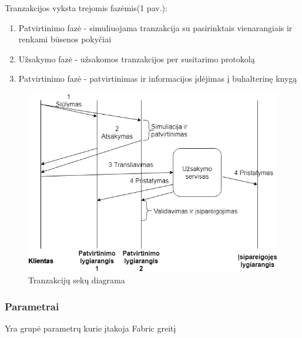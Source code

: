 \documentclass{VUMIFPSkursinis}
\begin{document}
			Tranzakcijos vyksta trejomis fazėmis(1 pav.):
			\begin{enumerate}
				\item{Patvirtinimo fazė - simuliuojama tranzakcija su pasirinktais vienarangiais ir renkami būsenos pokyčiai}
				\item{Užsakymo fazė - užsakomos tranzakcijos per susitarimo protokolą}
				\item{Patvirtinimo fazė - patvirtinimas ir informacijos įdėjimas į buhalterinę knygą }
			\end{enumerate}

\begin{figure}[H]
    \centering
    \includegraphics[scale=0.5]{img/MLP}
    \caption{Tranzakcijų sekų diagrama}   %
    \label{img:mlp}
\end{figure}



				
		\subsubsection{Parametrai}

Yra grupė parametrų \cite{IMBResearch} kurie įtakoja Fabric greitį 
			
\end{document}
